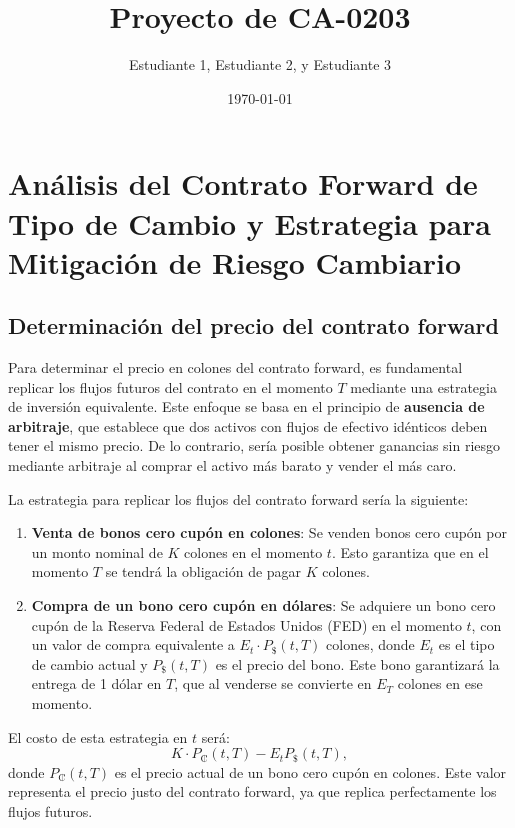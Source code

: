 \documentclass[12pt]{article}
\author{Estudiante 1, Estudiante 2, y Estudiante 3}
\date{\today}
\title{Proyecto de CA-0203}
\begin{document}
\maketitle

\newpage
\tableofcontents

\newpage

\section*{Análisis del Contrato Forward de Tipo de Cambio y Estrategia para Mitigación de Riesgo Cambiario}

\subsection*{Determinación del precio del contrato forward}

Para determinar el precio en colones del contrato forward, es fundamental replicar los flujos futuros del contrato en el momento \( T \) mediante una estrategia de inversión equivalente. Este enfoque se basa en el principio de \textbf{ausencia de arbitraje}, que establece que dos activos con flujos de efectivo idénticos deben tener el mismo precio. De lo contrario, sería posible obtener ganancias sin riesgo mediante arbitraje al comprar el activo más barato y vender el más caro.

La estrategia para replicar los flujos del contrato forward sería la siguiente:

\begin{enumerate}
    \item \textbf{Venta de bonos cero cupón en colones}: Se venden bonos cero cupón por un monto nominal de \( K \) colones en el momento \( t \). Esto garantiza que en el momento \( T \) se tendrá la obligación de pagar \( K \) colones.
    \item \textbf{Compra de un bono cero cupón en dólares}: Se adquiere un bono cero cupón de la Reserva Federal de Estados Unidos (FED) en el momento \( t \), con un valor de compra equivalente a \( E_t \cdot P_{\text{\$}}(t, T) \) colones, donde \( E_t \) es el tipo de cambio actual y \( P_{\text{\$}}(t, T) \) es el precio del bono. Este bono garantizará la entrega de 1 dólar en \( T \), que al venderse se convierte en \( E_T \) colones en ese momento.
\end{enumerate}

El costo de esta estrategia en \( t \) será:
\[
K \cdot P_{\text{₡}}(t, T) - E_t P_{\text{\$}}(t, T),
\]
donde \( P_{\text{₡}}(t, T) \) es el precio actual de un bono cero cupón en colones. Este valor representa el precio justo del contrato forward, ya que replica perfectamente los flujos futuros.
\end{document}
